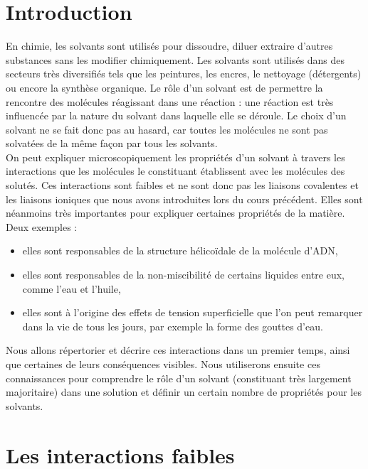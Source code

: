 \documentclass[11pt,a4paper]{report}
\begin{document}
\newpage
\section*{Introduction}

En chimie, les solvants sont utilisés pour dissoudre, diluer extraire d'autres substances sans les modifier chimiquement. Les solvants sont utilisés dans des secteurs très diversifiés tels que les peintures, les encres, le nettoyage (détergents) ou encore la synthèse organique. Le rôle d'un solvant est de permettre la rencontre des molécules réagissant dans une réaction : une réaction est très influencée par la nature du solvant dans laquelle elle se déroule. Le choix d'un solvant ne se fait donc pas au hasard, car toutes les molécules ne sont pas solvatées de la même façon par tous les solvants.\\

On peut expliquer microscopiquement les propriétés d'un solvant à travers les interactions que les molécules le constituant établissent avec les molécules des solutés. Ces interactions sont faibles et ne sont donc pas les liaisons covalentes et les liaisons ioniques que nous avons introduites lors du cours précédent. Elles sont néanmoins très importantes pour expliquer certaines propriétés de la matière. Deux exemples :
\begin{itemize}
	\item elles sont responsables de la structure hélicoïdale de la molécule d'ADN,
	\item elles sont responsables de la non-miscibilité de certains liquides entre eux, comme l'eau 			et l'huile,
	\item elles sont à l'origine des effets de tension superficielle que l'on peut remarquer dans la 		vie de tous les jours, par exemple la forme des gouttes d'eau.\\ 
\end{itemize}

Nous allons répertorier et décrire ces interactions dans un premier temps, ainsi que certaines de leurs conséquences visibles. Nous utiliserons ensuite ces connaissances pour comprendre le rôle d'un solvant (constituant très largement majoritaire) dans une solution et définir un certain nombre de propriétés pour les solvants.

\newpage
\section{Les interactions faibles}\label{sec:1}
\end{document}

